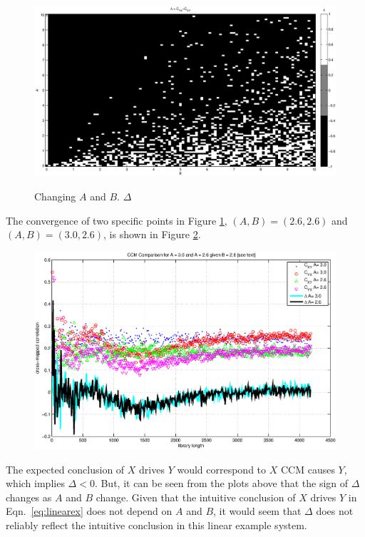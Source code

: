 \documentclass[a4paper,11pt]{article}
\begin{document}
\begin{center}
\begin{figure}[ht]
\includegraphics[scale=0.55]{LinearEx3colortemp.eps} \\
\caption{Changing $A$ and $B$. $\Delta$}
\label{fig:linearex1}
\end{figure}
\end{center}
The convergence of two specific points in Figure \ref{fig:linearex1}, $(A,B) = (2.6,2.6)$ and $(A,B)=(3.0,2.6)$, is shown in Figure \ref{fig:linearex1a}.
\begin{center}
\begin{figure}[ht]
\includegraphics[scale=0.7]{RLCircuitPlots/LinearEx_ChangeL.eps} \\
\caption{}
\label{fig:linearex1a}
\end{figure}
\end{center}
The expected conclusion of $X$ drives $Y$ would correspond to  $X$ CCM causes $Y$, which implies $\Delta<0$.  But, it can be seen from the plots above that the sign of $\Delta$ changes as $A$ and $B$ change.  Given that the intuitive conclusion of $X$ drives $Y$ in Eqn.\ \ref{eq:linearex} does not depend on $A$ and $B$, it would seem that $\Delta$ does not reliably reflect the intuitive conclusion in this linear example system.  
\end{document}
